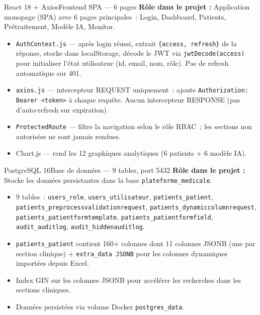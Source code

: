 \documentclass[12pt,a4paper]{article}
\begin{document}
\begin{toolbox}{React 18 + Axios}{Frontend SPA --- 6 pages}
\textbf{Rôle dans le projet :} Application monopage (SPA) avec 6 pages principales~:
Login, Dashboard, Patients, Prétraitement, Modèle IA, Monitor.

\begin{itemize}[leftmargin=1.5em, itemsep=2pt]
  \item \texttt{AuthContext.js} --- après login réussi, extrait
    \texttt{\{access, refresh\}} de la réponse, stocke dans localStorage, décode
    le JWT via \texttt{jwtDecode(access)} pour initialiser l'état utilisateur
    (id, email, nom, rôle). Pas de refresh automatique sur 401.
  \item \texttt{axios.js} --- intercepteur REQUEST uniquement~: ajoute
    \texttt{Authorization: Bearer <token>} à chaque requête. Aucun intercepteur
    RESPONSE (pas d'auto-refresh sur expiration).
  \item \texttt{ProtectedRoute} --- filtre la navigation selon le rôle RBAC~;
    les sections non autorisées ne sont jamais rendues.
  \item Chart.js --- rend les 12 graphiques analytiques (6 patients + 6 modèle IA).
\end{itemize}
\end{toolbox}

\begin{toolbox}{PostgreSQL 16}{Base de données --- 9 tables, port 5432}
\textbf{Rôle dans le projet :} Stocke les données persistantes dans la base
\texttt{plateforme\_medicale}.

\begin{itemize}[leftmargin=1.5em, itemsep=2pt]
  \item 9 tables~: \texttt{users\_role}, \texttt{users\_utilisateur},
    \texttt{patients\_patient}, \texttt{patients\_preprocessvalidationrequest},
    \texttt{patients\_dynamiccolumnrequest}, \texttt{patients\_patientformtemplate},
    \texttt{patients\_patientformfield}, \texttt{audit\_auditlog},
    \texttt{audit\_hiddenauditlog}.
  \item \texttt{patients\_patient} contient 160+ colonnes dont 11 colonnes JSONB
    (une par section clinique) + \texttt{extra\_data JSONB} pour les colonnes
    dynamiques importées depuis Excel.
  \item Index GIN sur les colonnes JSONB pour accélérer les recherches dans les
    sections cliniques.
  \item Données persistées via volume Docker \texttt{postgres\_data}.
\end{itemize}
\end{toolbox}
\end{document}
